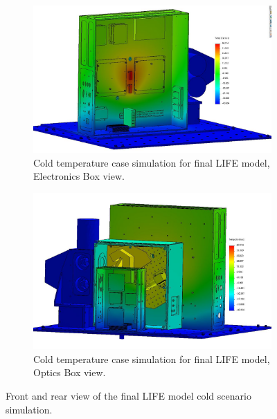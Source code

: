 \begin{figure}
    \centering
    \begin{subfigure}[h]{0.9\textwidth}
        \centering
        \includegraphics[width=\textwidth]{chap3_images/LIFE_V5_initial_images/Iteration_1_ebox_no_labels.JPG}
        \caption{Cold temperature case simulation for final LIFE model, Electronics Box view.}
        \label{fig:LIFE_V5_FINAL_TA_COLD_EBOX}
    \end{subfigure}
    \begin{subfigure}[h]{0.9\textwidth}
        \centering
        \includegraphics[width=\textwidth]{chap3_images/LIFE_V5_initial_images/Iteration_1_no_labels.JPG}
        \caption{Cold temperature case simulation for final LIFE model, Optics Box view.}
        \label{fig:LIFE_V5_FINAL_TA_COLD_OBOX}
    \end{subfigure}
    \caption{Front and rear view of the final LIFE model cold scenario simulation.}
    \label{LIFE_V5_FINAL_TA_COLD}
\end{figure}

